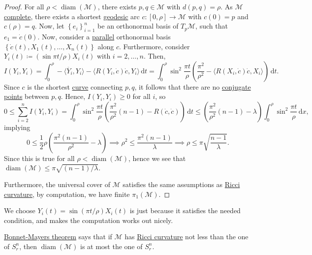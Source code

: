\begin{proof}
	For all \(\rho < \mathop{\mathrm{diam}}(\mathcal{M} ) \), there exists \(p, q\in \mathcal{M} \) with \(d(p, q) = \rho \). As \(\mathcal{M} \) \hyperref[def:geodesically-complete]{complete}, there exists a shortest \hyperref[def:geodesic]{geodesic} arc \(c \colon [0, \rho ] \to \mathcal{M} \) with \(c(0) = p\) and \(c(\rho ) = q\). Now, let \(\left\{ e_i \right\} _{i=1}^n\) be an orthonormal basis of \(T_p \mathcal{M} \), such that \(e_1 = \dot{c} (0)\). Now, consider a \hyperref[def:parallel]{parallel} orthonormal basis \(\left\{ \dot{c} (t), X_1(t), \ldots , X_n(t) \right\} \) along \(c\). Furthermore, consider \(Y_i(t) \coloneqq (\sin \pi t / \rho )X_i (t)\) with \(i = 2, \ldots , n\). Then,
	\[
		I(Y_i, Y_i)
		= \int_{0}^{\rho } - \langle \ddot{Y_i} , Y_i \rangle - \langle R(Y_i, \dot{c})\dot{c} , Y_i \rangle  \,\mathrm{d}t
		= \int_{0}^{\rho } \sin ^2 \frac{\pi t}{\rho } \left( \frac{\pi ^2}{\rho ^2} - \langle R(X_i, \dot{c} )\dot{c}, X_i  \rangle \right)  \,\mathrm{d}t.
	\]
	Since \(c\) is the shortest \hyperref[def:curve]{curve} connecting \(p, q\), it follows that there are no \hyperref[def:conjugate-point]{conjugate points} between \(p, q\). Hence, \(I(Y_i, Y_i) \geq 0\) for all \(i\), so
	\[
		0
		\leq \sum_{i=2}^{n} I(Y_i, Y_i)
		= \int_{0}^{\rho} \sin ^2 \frac{\pi t}{\rho } \left( \frac{\pi ^2}{\rho ^2} (n-1) - R(\dot{c} , \dot{c} ) \right) \,\mathrm{d}t
		\leq \left( \frac{\pi ^2}{\rho ^2}(n-1) - \lambda \right) \int_{0}^{\rho } \sin ^2 \frac{\pi t}{\rho } \,\mathrm{d}x,
	\]
	implying
	\[
		0 \leq \frac{1}{2} \rho \left( \frac{\pi ^2(n-1)}{\rho ^2} - \lambda  \right)
		\implies \rho ^2 \leq \frac{\pi ^2 (n-1)}{\lambda }
		\implies \rho \leq \pi \sqrt{\frac{n-1}{\lambda }}.
	\]
	Since this is true for all \(\rho < \mathop{\mathrm{diam}}(\mathcal{M} ) \), hence we see that \(\mathop{\mathrm{diam}}(\mathcal{M} ) \leq \pi \sqrt{(n-1) / \lambda } \).

	Furthermore, the universal cover of \(\mathcal{M} \) satisfies the same assumptions as \hyperref[def:Ricci-curvature]{Ricci curvature}, by computation, we have finite \(\pi _1(\mathcal{M} )\).
\end{proof}

\begin{remark}
	We choose \(Y_i(t) = \sin (\pi t / \rho ) X_i(t)\) is just because it satisfies the needed condition, and makes the computation works out nicely.
\end{remark}

\begin{intuition}
	\hyperref[thm:Bonnet-Mayers]{Bonnet-Mayers theorem} says that if \(\mathcal{M} \) has \hyperref[def:Ricci-curvature]{Ricci curvature} not less than the one of \(S^n_r\), then \(\mathop{\mathrm{diam}}(\mathcal{M} ) \) is at most the one of \(S^n_r\).
\end{intuition}

